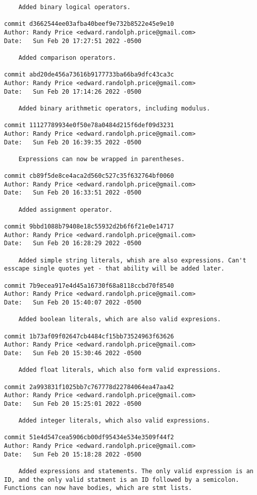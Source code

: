 {\begin{verbatim}
    Added binary logical operators.

commit d3662544ee03afba40beef9e732b8522e45e9e10
Author: Randy Price <edward.randolph.price@gmail.com>
Date:   Sun Feb 20 17:27:51 2022 -0500

    Added comparison operators.

commit abd20de456a73616b9177733ba66ba9dfc43ca3c
Author: Randy Price <edward.randolph.price@gmail.com>
Date:   Sun Feb 20 17:14:26 2022 -0500

    Added binary arithmetic operators, including modulus.

commit 11127789934e0f50e78a0484d215f6def09d3231
Author: Randy Price <edward.randolph.price@gmail.com>
Date:   Sun Feb 20 16:39:35 2022 -0500

    Expressions can now be wrapped in parentheses.

commit cb89f5de8ce4aca2d560c527c35f632764bf0060
Author: Randy Price <edward.randolph.price@gmail.com>
Date:   Sun Feb 20 16:33:51 2022 -0500

    Added assignment operator.

commit 9bbd1088b79408e18c55932d2b6f6f21e0e14717
Author: Randy Price <edward.randolph.price@gmail.com>
Date:   Sun Feb 20 16:28:29 2022 -0500

    Added simple string literals, whish are also expressions. Can't esscape single quotes yet - that ability will be added later.

commit 7b9ecea917e4d45a16730f68a8118ccbd70f8540
Author: Randy Price <edward.randolph.price@gmail.com>
Date:   Sun Feb 20 15:40:07 2022 -0500

    Added boolean literals, which are also valid expresions.

commit 1b73af09f02647cb4484cf15bb73524963f63626
Author: Randy Price <edward.randolph.price@gmail.com>
Date:   Sun Feb 20 15:30:46 2022 -0500

    Added float literals, which also form valid expressions.

commit 2a993831f1025bb7c767778d22784064ea47aa42
Author: Randy Price <edward.randolph.price@gmail.com>
Date:   Sun Feb 20 15:25:01 2022 -0500

    Added integer literals, which also valid expressions.

commit 51e4d547cea5906cb00df95434e534e3509f44f2
Author: Randy Price <edward.randolph.price@gmail.com>
Date:   Sun Feb 20 15:18:28 2022 -0500

    Added expressions and statements. The only valid expression is an ID, and the only valid statment is an ID followed by a semicolon. Functions can now have bodies, which are stmt lists.


\end{verbatim}}
